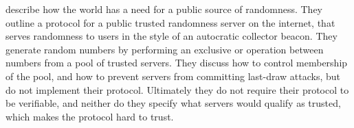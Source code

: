 \item[A Public Randomness Service]
\citet{fischer2011publicrandomnessservice} describe how the world has a need for a public source of randomness. They outline a protocol for a public trusted randomness server on the internet, that serves randomness to users in the style of an autocratic collector beacon. They generate random numbers by performing an exclusive or operation between numbers from a pool of trusted servers. They discuss how to control membership of the pool, and how to prevent servers from committing last-draw attacks, but do not implement their protocol. Ultimately they do not require their protocol to be verifiable, and neither do they specify what servers would qualify as trusted, which makes the protocol hard to trust. 